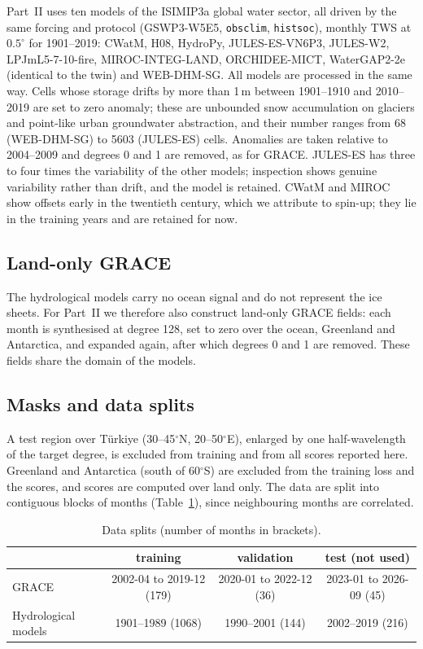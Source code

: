 \documentclass[11pt,a4paper]{article}
\newcommand{\code}[1]{\texttt{#1}}
\begin{document}
Part~II uses ten models of the ISIMIP3a global water sector, all driven by the same forcing and
protocol (GSWP3-W5E5, \code{obsclim}, \code{histsoc}), monthly TWS at $0.5^\circ$ for
1901--2019: CWatM, H08, HydroPy, JULES-ES-VN6P3, JULES-W2, LPJmL5-7-10-fire, MIROC-INTEG-LAND,
ORCHIDEE-MICT, WaterGAP2-2e (identical to the twin) and WEB-DHM-SG. All models are processed in
the same way. Cells whose storage drifts by more than 1\,m between 1901--1910 and 2010--2019 are
set to zero anomaly; these are unbounded snow accumulation on glaciers and point-like urban
groundwater abstraction, and their number ranges from 68 (WEB-DHM-SG) to 5603 (JULES-ES) cells.
Anomalies are taken relative to 2004--2009 and degrees 0 and 1 are removed, as for GRACE.
JULES-ES has three to four times the variability of the other models; inspection shows genuine
variability rather than drift, and the model is retained. CWatM and MIROC show offsets early in
the twentieth century, which we attribute to spin-up; they lie in the training years and are
retained for now.

\subsection{Land-only GRACE}
The hydrological models carry no ocean signal and do not represent the ice sheets. For Part~II
we therefore also construct land-only GRACE fields: each month is synthesised at degree 128,
set to zero over the ocean, Greenland and Antarctica, and expanded again, after which degrees
0 and 1 are removed. These fields share the domain of the models.

\subsection{Masks and data splits}\label{sec:masks}
A test region over Türkiye (30--45$^\circ$N, 20--50$^\circ$E), enlarged by one half-wavelength
of the target degree, is excluded from training and from all scores reported here. Greenland
and Antarctica (south of 60$^\circ$S) are excluded from the training loss and the scores, and
scores are computed over land only. The data are split into contiguous blocks of months
(Table~\ref{tab:splits}), since neighbouring months are correlated.

\begin{table}[ht]
\centering\small
\caption{Data splits (number of months in brackets).}
\label{tab:splits}
\begin{tabular}{lccc}
  \toprule
  & training & validation & test (not used) \\
  \midrule
  GRACE & 2002-04 to 2019-12 (179) & 2020-01 to 2022-12 (36) & 2023-01 to 2026-09 (45) \\
  Hydrological models & 1901--1989 (1068) & 1990--2001 (144) & 2002--2019 (216) \\
  \bottomrule
\end{tabular}
\end{table}
\end{document}
